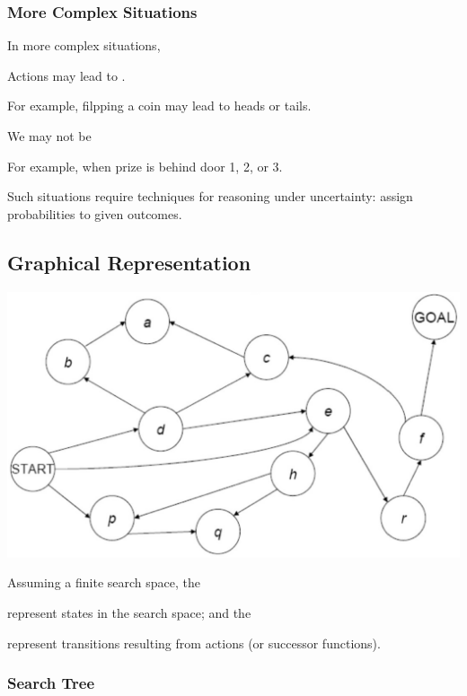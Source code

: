 \subsubsection{More Complex Situations}

In more complex situations, 

\begin{listu}
    \item Actions may lead to . 
    
    For example, filpping a coin may lead to heads or tails.

    \item We may not be 
    
    For example, when prize is behind door 1, 2, or 3.

    \item Such situations require techniques for reasoning under uncertainty: assign probabilities to given outcomes.
\end{listu}

\subsection{Graphical Representation}

\begin{center}
    \includegraphics[width=0.67\linewidth]{figures/Search Graph Rep.png}
\end{center}

Assuming a finite search space, the

\begin{listu}
    \item {} represent states in the search space; and the 
    \item {} represent transitions resulting from actions (or successor functions).
\end{listu}

\subsubsection{Search Tree}

